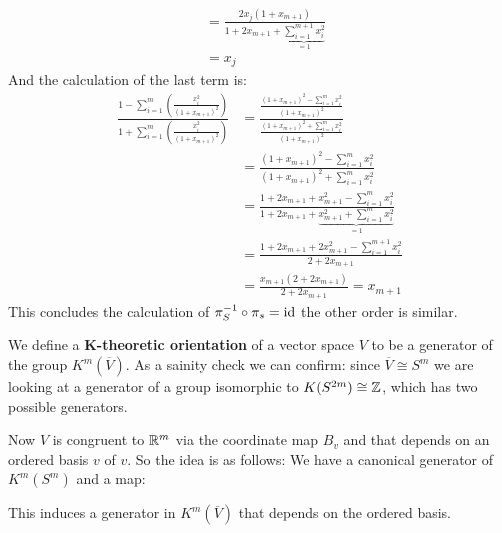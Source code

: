 \begin{remark}
\begin{align}
        & = \frac{2x_j(1+x_{m+1})}{1+2 x_{m+1}+\underbrace{\sum_{i=1}^{m+1} x_i^2}_{=1}} \\
        & = x_j
    \end{align}
    And the calculation of the last term is:
    \begin{align*}
        \frac{1-\sum_{i=1}^m(\frac{x_i^2}{(1+x_{m+1})^2})}{1+\sum_{i=1}^m(\frac{x_i^2}{(1+x_{m+1})^2})} 
        & = \frac{\frac{(1+x_{m+1})^2-\sum_{i=1}^m x_i^2}{(1+x_{m+1})^2}}{\frac{(1+x_{m+1})^2+\sum_{i=1}^m x_i^2}{(1+x_{m+1})^2}}\\
        & =\frac{(1+x_{m+1})^2-\sum_{i=1}^m x_i^2}{(1+x_{m+1})^2+\sum_{i=1}^m x_i^2} \\
        & = \frac{1+2x_{m+1}+x_{m+1}^2-\sum_{i=1}^m x_i^2}{1+2x_{m+1}+\underbrace{x_{m+1}^2+\sum_{i=1}^m x_i^2}_{=1}} \\
        & = \frac{1+2x_{m+1}+2x_{m+1}^2-\sum_{i=1}^{m+1} x_i^2}{2+2x_{m+1}} \\
        & = \frac{x_{m+1}(2+2x_{m+1})}{2+2x_{m+1}}=x_{m+1}
    \end{align*}
This concludes the calculation of $\pi_S^{-1}\circ \pi_s=\operatorname{\mathrm{id}}$ the other order is similar.
\end{remark}




\begin{definition}

     We define a \textbf{K-theoretic orientation} of a vector space $V$ to be a generator of the group $K^m(\overline{V})$. As a sainity check we can confirm: since $\overline{V}\cong S^m$ we are looking at a generator of a group isomorphic to $K(S^{2m})\cong \mathbb{Z}$, which has two possible generators.

     Now $V$ is congruent to $\mathbb{R}^m$ via the coordinate map $B_v$ and that depends on an ordered  basis $v$ of $v$. So the idea is as follows: 
     We have a canonical generator of $K^m(S^m)$ and a map:
   \begin{center}
   \end{center}
     This induces a generator in $K^m(\overline{V})$ that depends on the ordered basis. 
\end{definition}


